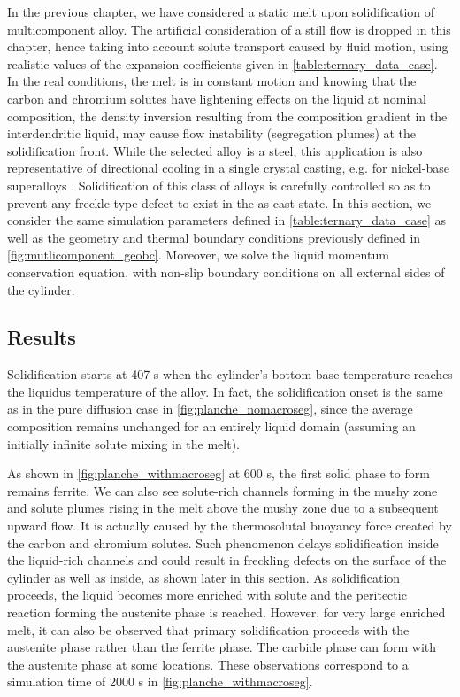 In the previous chapter, we have considered a static melt upon solidification of multicomponent alloy. 
The artificial consideration of a still flow is dropped in this chapter, hence taking into account solute transport 
caused by fluid motion, using realistic values of the expansion coefficients given in \cref{table:ternary_data_case}.
In the real conditions, the melt is in constant motion and knowing that the carbon and chromium solutes have lightening effects on the liquid 
at nominal composition, the density inversion resulting from the composition gradient in the interdendritic 
liquid, may cause flow instability (segregation plumes) at the solidification front. While the selected alloy 
is a steel, this application is also representative of directional cooling in a single crystal casting, e.g. 
for nickel-base superalloys \citep{beckermann_development_2000}. Solidification of this class of alloys is carefully
controlled so as to prevent any freckle-type defect to exist in the as-cast state.
In this section, we consider the same simulation parameters defined in \cref{table:ternary_data_case} as well as the geometry and thermal boundary conditions
previously defined in \cref{fig:mutlicomponent_geobc}. Moreover, we solve the liquid momentum conservation equation, with non-slip boundary conditions
on all external sides of the cylinder.

\subsection{Results}

Solidification starts at 407 s when the cylinder’s bottom base temperature 
reaches the liquidus temperature of the alloy. 
In fact, the solidification onset is the same as in the pure diffusion case in \cref{fig:planche_nomacroseg}, 
since the average composition remains unchanged for an entirely liquid domain (assuming an initially infinite 
solute mixing in the melt). 

As shown in \cref{fig:planche_withmacroseg} at 600 s, the first solid phase to form 
remains ferrite. We can also see solute-rich channels forming in the mushy zone and solute 
plumes rising in the melt above the mushy zone due to a subsequent upward flow. It is actually 
caused by the thermosolutal buoyancy force created by the carbon and chromium solutes. Such 
phenomenon delays solidification inside the liquid-rich channels and could result in freckling 
defects \citep{felicelli_simulation_1991} on the surface of the cylinder as well as inside, as shown later in this section. 
As solidification proceeds, the liquid becomes more enriched with solute and the peritectic 
reaction forming the austenite phase is reached. However, for very large enriched melt, it can 
also be observed that primary solidification proceeds with the austenite phase rather than the 
ferrite phase. The carbide phase can form with the austenite phase at some locations. These 
observations correspond to a simulation time of \num{2000} s in \cref{fig:planche_withmacroseg}. 

